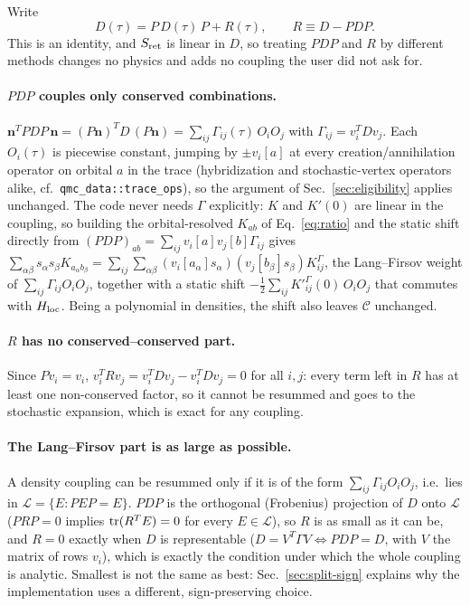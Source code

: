 \documentclass[a4paper,12pt]{article}
\renewcommand{\t}{\ensuremath{\tau}}
\newcommand{\Hloc}{\ensuremath{H_{\rm loc}}}
\begin{document}
Write
\begin{equation}
  D(\t)=P\,D(\t)\,P+R(\t),\qquad R\equiv D-PDP .
  \label{eq:split}
\end{equation}
This is an identity, and $S_{\rm ret}$ is linear in $D$, so treating $PDP$ and $R$ by
different methods changes no physics and adds no coupling the user did not ask for.

\paragraph{$PDP$ couples only conserved combinations.}
$\mathbf n^T PDP\,\mathbf n=(P\mathbf n)^T D\,(P\mathbf n)=\sum_{ij}\Gamma_{ij}(\t)\,O_iO_j$
with $\Gamma_{ij}=v_i^TDv_j$. Each $O_i(\t)$ is piecewise constant, jumping by
$\pm v_i[a]$ at every creation/annihilation operator on orbital $a$ in the trace
(hybridization and stochastic-vertex operators alike, cf.\ \texttt{qmc\_data::trace\_ops}),
so the argument of Sec.~\ref{sec:eligibility} applies unchanged. The code never needs
$\Gamma$ explicitly: $K$ and $K'(0)$ are linear in the coupling, so building the
orbital-resolved $K_{ab}$ of Eq.~\eqref{eq:ratio} and the static shift directly from
$(PDP)_{ab}=\sum_{ij}v_i[a]v_j[b]\Gamma_{ij}$ gives
$\sum_{\alpha\beta}s_\alpha s_\beta K_{a_\alpha b_\beta}
=\sum_{ij}\sum_{\alpha\beta}(v_i[a_\alpha]s_\alpha)(v_j[b_\beta]s_\beta)K^{\Gamma}_{ij}$,
the Lang--Firsov weight of $\sum_{ij}\Gamma_{ij}O_iO_j$, together with a static shift
$-\tfrac12\sum_{ij}K'^{\Gamma}_{ij}(0)\,O_iO_j$ that commutes with $\Hloc$. Being a
polynomial in densities, the shift also leaves $\mathcal C$ unchanged.

\paragraph{$R$ has no conserved--conserved part.}
Since $Pv_i=v_i$, $v_i^TRv_j=v_i^TDv_j-v_i^TDv_j=0$ for all $i,j$: every term left in
$R$ has at least one non-conserved factor, so it cannot be resummed and goes to the
stochastic expansion, which is exact for any coupling.

\paragraph{The Lang--Firsov part is as large as possible.}
A density coupling can be resummed only if it is of the form $\sum_{ij}\Gamma_{ij}O_iO_j$,
i.e.\ lies in $\mathcal L=\{E:PEP=E\}$. $PDP$ is the orthogonal (Frobenius) projection of
$D$ onto $\mathcal L$ ($PRP=0$ implies ${\rm tr}(R^TE)=0$ for every $E\in\mathcal L$), so
$R$ is as small as it can be, and $R=0$ exactly when $D$ is representable
($D=V^T\Gamma V\Leftrightarrow PDP=D$, with $V$ the matrix of rows $v_i$), which is
exactly the condition under which the whole coupling is analytic. Smallest is not the
same as best:
Sec.~\ref{sec:split-sign} explains why the implementation uses a different, sign-preserving
choice.
\end{document}
